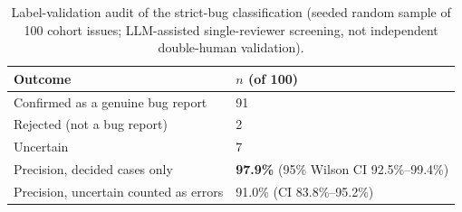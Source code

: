 \begin{table}[t]
\centering
\caption{Label-validation audit of the strict-bug classification (seeded random sample of 100 cohort issues; LLM-assisted single-reviewer screening, not independent double-human validation).\label{tab:validation}}
\small \begin{tabular}{@{}lp{}@{}}
\toprule
Outcome & $n$ (of 100) \\\midrule
Confirmed as a genuine bug report & 91 \\
Rejected (not a bug report) & 2 \\
Uncertain & 7 \\
\midrule
Precision, decided cases only & \textbf{97.9\%} (95\% Wilson CI 92.5\%--99.4\%) \\
Precision, uncertain counted as errors & 91.0\% (CI 83.8\%--95.2\%) \\
\bottomrule
\end{tabular}
\end{table}
